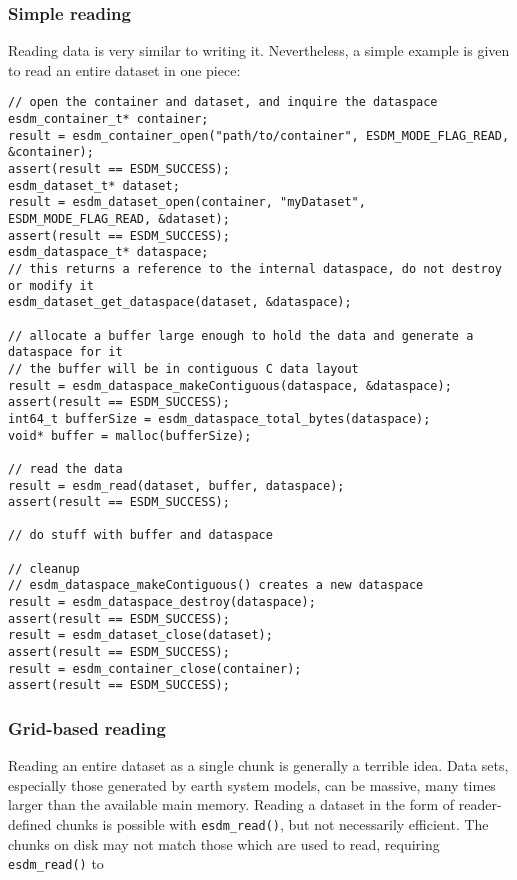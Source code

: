 \subsubsection{Simple reading}

Reading data is very similar to writing it. 
Nevertheless, a simple example is given to read an entire dataset in one piece:

\begin{lstlisting}
// open the container and dataset, and inquire the dataspace
esdm_container_t* container;
result = esdm_container_open("path/to/container", ESDM_MODE_FLAG_READ, &container);
assert(result == ESDM_SUCCESS);
esdm_dataset_t* dataset;
result = esdm_dataset_open(container, "myDataset", ESDM_MODE_FLAG_READ, &dataset);
assert(result == ESDM_SUCCESS);
esdm_dataspace_t* dataspace;
// this returns a reference to the internal dataspace, do not destroy or modify it
esdm_dataset_get_dataspace(dataset, &dataspace);  

// allocate a buffer large enough to hold the data and generate a dataspace for it
// the buffer will be in contiguous C data layout
result = esdm_dataspace_makeContiguous(dataspace, &dataspace);  
assert(result == ESDM_SUCCESS);
int64_t bufferSize = esdm_dataspace_total_bytes(dataspace);
void* buffer = malloc(bufferSize);

// read the data
result = esdm_read(dataset, buffer, dataspace);
assert(result == ESDM_SUCCESS);

// do stuff with buffer and dataspace

// cleanup
// esdm_dataspace_makeContiguous() creates a new dataspace
result = esdm_dataspace_destroy(dataspace); 
assert(result == ESDM_SUCCESS);
result = esdm_dataset_close(dataset);
assert(result == ESDM_SUCCESS);
result = esdm_container_close(container);
assert(result == ESDM_SUCCESS);
\end{lstlisting}

\subsubsection{Grid-based reading}
Reading an entire dataset as a single chunk is generally a terrible idea. 
Data sets, especially those generated by earth system models, can be massive, many times larger than the available main memory. 
Reading a dataset in the form of reader-defined chunks is possible with \lstinline|esdm_read()|, but not necessarily efficient. 
The chunks on disk may not match those which are used to read, requiring \lstinline|esdm_read()| to


